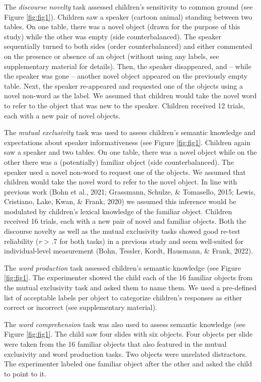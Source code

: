 \documentclass[
  man,mask,floatsintext]{apa6}
\begin{document}
The \emph{discourse novelty} task assessed children's sensitivity to common ground (see Figure \ref{fig:fig1}). Children saw a speaker (cartoon animal) standing between two tables. On one table, there was a novel object (drawn for the purpose of this study) while the other was empty (side counterbalanced). The speaker sequentially turned to both sides (order counterbalanced) and either commented on the presence or absence of an object (without using any labels, see supplementary material for details). Then, the speaker disappeared, and -- while the speaker was gone -- another novel object appeared on the previously empty table. Next, the speaker re-appeared and requested one of the objects using a novel non-word as the label. We assumed that children would take the novel word to refer to the object that was new to the speaker. Children received 12 trials, each with a new pair of novel objects.

The \emph{mutual exclusivity} task was used to assess children's semantic knowledge and expectations about speaker informativeness (see Figure \ref{fig:fig1}. Children again saw a speaker and two tables. On one table, there was a novel object while on the other there was a (potentially) familiar object (side counterbalanced). The speaker used a novel non-word to request one of the objects. We assumed that children would take the novel word to refer to the novel object. In line with previous work (Bohn et al., 2021; Grassmann, Schulze, \& Tomasello, 2015; Lewis, Cristiano, Lake, Kwan, \& Frank, 2020) we assumed this inference would be modulated by children's lexical knowledge of the familiar object. Children received 16 trials, each with a new pair of novel and familiar objects. Both the discourse novelty as well as the mutual exclusivity tasks showed good re-test reliability (\emph{r} \textgreater{} .7 for both tasks) in a previous study and seem well-suited for individual-level measurement (Bohn, Tessler, Kordt, Hausmann, \& Frank, 2022).

The \emph{word production} task assessed children's semantic knowledge (see Figure \ref{fig:fig1}. The experimenter showed the child each of the 16 familiar objects from the mutual exclusivity task and asked them to name them. We used a pre-defined list of acceptable labels per object to categorize children's responses as either correct or incorrect (see supplementary material).

The \emph{word comprehension} task was also used to assess semantic knowledge (see Figure \ref{fig:fig1}. The child saw four slides with six objects. Four objects per slide were taken from the 16 familiar objects that also featured in the mutual exclusivity and word production tasks. Two objects were unrelated distractors. The experimenter labeled one familiar object after the other and asked the child to point to it.
\end{document}
